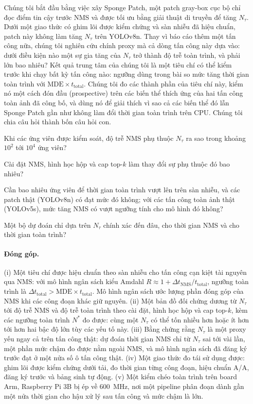 \documentclass[a4paper,fleqn]{cas-dc}
\newcommand{\Ntau}{N_{\tau}}
\begin{document}
Chúng tôi bắt đầu bằng việc xây Sponge Patch, một patch gray-box cục bộ chỉ đọc điểm tin cậy trước NMS và được tối ưu bằng giải thuật di truyền để tăng $\Ntau$. Dưới một giao thức có ghim lõi được kiểm chứng và sàn nhiễu đã hiệu chuẩn, patch này không làm tăng $\Ntau$ trên YOLOv8n. Thay vì báo cáo thêm một tấn công nữa, chúng tôi nghiên cứu chính proxy mà cả dòng tấn công này dựa vào: dưới điều kiện nào một sự gia tăng của $\Ntau$ trở thành độ trễ toàn trình, và phải lớn bao nhiêu? Kết quả trung tâm của chúng tôi là một tiêu chí có thể kiểm trước khi chạy bất kỳ tấn công nào: ngưỡng dùng trong bài so mức tăng thời gian toàn trình với $\mathrm{MDE}\times t_{\mathrm{total}}$. Chúng tôi đo các thành phần của tiêu chí này, kiểm nó một cách đón đầu (prospective) trên các biến thể thích ứng của hai tấn công toàn ảnh đã công bố, và dùng nó để giải thích vì sao cả các biến thể đó lẫn Sponge Patch gần như không làm đổi thời gian toàn trình trên CPU. Chúng tôi chia câu hỏi thành bốn câu hỏi con.
\begin{description}[leftmargin=2.5em,labelwidth=2.2em,itemsep=2pt]
\item[Q1] Khi các ứng viên được kiểm soát, độ trễ NMS phụ thuộc $\Ntau$ ra sao trong khoảng $10^2$ tới $10^4$ ứng viên?
\item[Q2] Cài đặt NMS, hình học hộp và cap top-$k$ làm thay đổi sự phụ thuộc đó bao nhiêu?
\item[Q3] Cần bao nhiêu ứng viên để thời gian toàn trình vượt lên trên sàn nhiễu, và các patch thật (YOLOv8n) có đạt mức đó không; với các tấn công toàn ảnh thật (YOLOv5s), mức tăng NMS có vượt ngưỡng tính cho mô hình đó không?
\item[Q4] Một bộ dự đoán chỉ dựa trên $\Ntau$ chính xác đến đâu, cho thời gian NMS và cho thời gian toàn trình?
\end{description}

\paragraph{Đóng góp.}
(i) Một tiêu chí được hiệu chuẩn theo sàn nhiễu cho tấn công cạn kiệt tài nguyên qua NMS: với mô hình ngân sách kiểu Amdahl $R \approx 1 + \Delta t_{\mathrm{NMS}}/t_{\mathrm{total}}$, ngưỡng toàn trình là $\Delta t_{\mathrm{total}} > \mathrm{MDE}\times t_{\mathrm{total}}$. Mô hình ngân sách ước lượng phần đóng góp của NMS khi các công đoạn khác giữ nguyên. (ii) Một bản đồ đối chứng dương từ $\Ntau$ tới độ trễ NMS và độ trễ toàn trình theo cài đặt, hình học hộp và cap top-$k$, kèm các ngưỡng toàn trình $N^{*}$ đo được: cùng một $\Ntau$ có thể tốn nhiều hơn hoặc ít hơn tới hơn hai bậc độ lớn tùy các yếu tố này. (iii) Bằng chứng rằng $\Ntau$ là một proxy yếu ngay cả trên tấn công thật: dự đoán thời gian NMS chỉ từ $\Ntau$ sai tới vài lần, một phần mức chậm đo được nằm ngoài NMS, và mô hình ngân sách đã đăng ký trước đạt ở một nửa số ô tấn công thật. (iv) Một giao thức đo tái sử dụng được: ghim lõi được kiểm chứng dưới tải, đo thời gian từng công đoạn, hiệu chuẩn A/A, đăng ký trước và bảng sinh tự động. (v) Một kiểm chéo toàn trình trên board Arm, Raspberry Pi 3B bị ép về 600~MHz, nơi một pipeline phân đoạn dành gần một nửa thời gian cho hậu xử lý sau tấn công và mức chậm là lớn.
\end{document}
